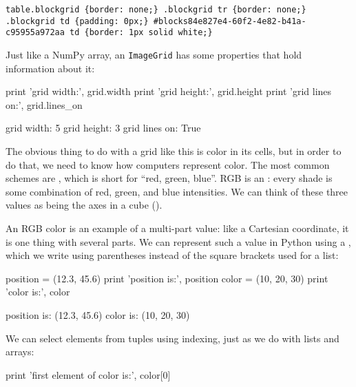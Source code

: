 \documentclass{book}
\begin{document}
\begin{Verbatim}
table.blockgrid {border: none;} .blockgrid tr {border: none;} .blockgrid td {padding: 0px;} #blocks84e827e4-60f2-4e82-b41a-c95955a972aa td {border: 1px solid white;}
\end{Verbatim}

Just like a NumPy array, an \texttt{ImageGrid} has some properties that
hold information about it:

\begin{VerbIn}
print 'grid width:', grid.width
print 'grid height:', grid.height
print 'grid lines on:', grid.lines_on
\end{VerbIn}

\begin{VerbOut}
grid width: 5
grid height: 3
grid lines on: True
\end{VerbOut}

The obvious thing to do with a grid like this is color in its cells,
but in order to do that, we need to know how computers represent
color. The most common schemes are , which is short for
``red, green, blue''. RGB is an :
every shade is some combination of red, green, and blue
intensities. We can think of these three values as being the axes in a
cube ().


An RGB color is an example of a multi-part value: like a Cartesian
coordinate, it is one thing with several parts. We can represent such a
value in Python using a , which we write using
parentheses instead of the square brackets used for a list:

\begin{VerbIn}
position = (12.3, 45.6)
print 'position is:', position
color = (10, 20, 30)
print 'color is:', color
\end{VerbIn}

\begin{VerbOut}
position is: (12.3, 45.6)
color is: (10, 20, 30)
\end{VerbOut}

We can select elements from tuples using indexing, just as we do with
lists and arrays:

\begin{VerbIn}
print 'first element of color is:', color[0]
\end{VerbIn}
\end{document}
